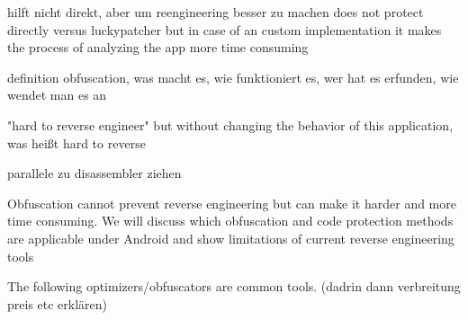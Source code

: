 hilft nicht direkt, aber um reengineering besser zu machen
does not protect directly versus luckypatcher but in case of an custom implementation it makes the process of analyzing the app more time consuming

definition obfuscation, was macht es, wie funktioniert es, wer hat es erfunden, wie wendet man es an\newline

"hard to reverse engineer" but without changing the behavior of this
application, was heißt hard to reverse\newline

parallele zu disassembler ziehen\newline

Obfuscation cannot prevent reverse engineering but can make it harder and more time consuming. We will discuss which obfuscation and code protection methods are applicable under Android and show limitations of current reverse engineering tools\newline

The following optimizers/obfuscators are common tools. (dadrin dann verbreitung preis etc erklären)
